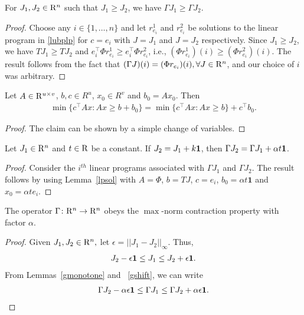 \documentclass[12pt,draftcls,onecolumn]{IEEEtran}
\begin{document}
\begin{lemma}\label{gmonotone}
For $J_1, J_2\in \mathrm{R}^n$ such that $J_1\geq J_2$, we have $\Gamma J_1\geq \Gamma J_2$.
\end{lemma}
\begin{proof}
Choose any $i\in \{1,\ldots,n\}$ and let $r^1_{e_i}$ and $r^2_{e_i}$ be solutions to the linear program in \eqref{lubplp} for $c=e_i$ with $J=J_1$ and $J=J_2$ respectively. Since $J_1\geq J_2$, we have $TJ_1\geq TJ_2$ and $e_i^\top \Phi r^1_{e_i} \geq e_i^\top \Phi r^2_{e_i}$, i.e., $(\Phi r^1_{e_i})(i)\geq (\Phi r^2_{e_i})(i)$. The result follows from the fact that $(\Gamma J)(i)=(\Phi r_{e_i})(i),\relax{ }\forall J\in \mathrm{R}^n$, and our choice of $i$ was arbitrary.
\end{proof}
\begin{lemma}\label{lpsol}
Let $A\in \mathrm{R}^{u\times v}$, $b,c\in R^u$, $x_0 \in R^v$ and $b_0=Ax_0$. Then
\begin{align}
\min\{c^\top Ax:Ax\geq b+b_0\} =\min\{c^\top Ax:Ax\geq b\}+c^\top b_0.
\end{align}
\end{lemma}
\begin{proof}
The claim can be shown by a simple change of variables.
\end{proof}
\begin{lemma}\label{gshift}
Let $J_1\in \mathrm{R}^n$ and $t\in \mathrm{R}$ be a constant. If $J_2=J_1+k\mathbf{1}$, then $\Gamma J_2=\Gamma J_1+\alpha t\mathbf{1}$.
\end{lemma}
\begin{proof}
Consider the $i^{th}$ linear programs associated with $\Gamma J_1$ and $\Gamma J_2$. The result follows by using Lemma~\ref{lpsol} with $A=\Phi$, $b=TJ$, $c=e_i$, $b_0=\alpha t\mathbf{1}$ and $x_0=\alpha t e_i$.
\end{proof}
\begin{theorem}\label{gmaxcontra}
The operator $\Gamma  \colon \mathrm{R}^n\rightarrow \mathrm{R}^n$ obeys the $\max$-norm contraction property with factor $\alpha$.
\end{theorem}
\begin{proof}
Given $J_1,J_2\in \mathrm{R}^n,$ let $\epsilon=||J_1-J_2||_\infty$. Thus,
\begin{align}\label{ineq}
J_2-\epsilon\one\leq J_1\leq J_2+\epsilon \one.
\end{align}
From Lemmas~\ref{gmonotone} and ~\ref{gshift}, we can write
\begin{align}\label{ineq}
\Gamma J_2-\alpha \epsilon\one\leq \Gamma J_1\leq \Gamma J_2+\alpha \epsilon\one.
\end{align}
\end{proof}
\end{document}
